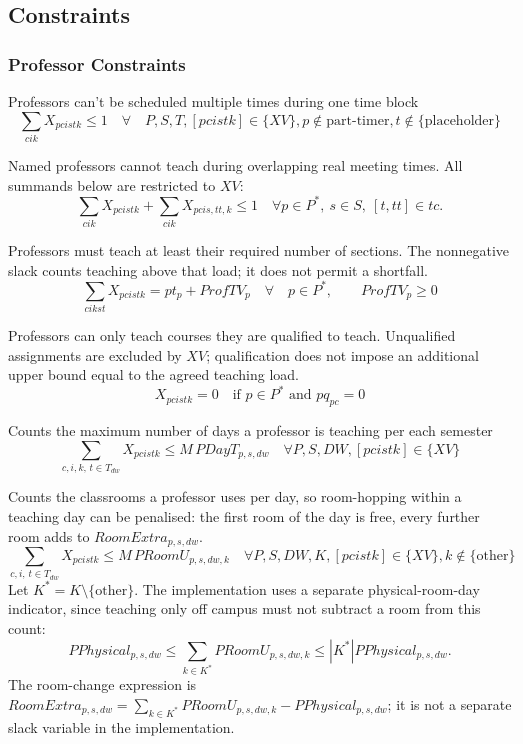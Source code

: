 \documentclass[11pt, oneside]{article}   	%
\begin{document}
\subsection{Constraints}


\subsubsection{Professor Constraints}
Professors can't be scheduled multiple times during one time block
\begin{equation}
	\sum_{cik} X_{pcistk} \le 1 \quad \forall \quad P, S,T, 
	[pcistk] \in \{ XV \}, p \not \in {\text{part-timer}},  t \not \in \{\text{placeholder} \}
\end{equation}

Named professors cannot teach during overlapping real meeting times. All
summands below are restricted to $XV$:
\begin{equation}
	\sum_{cik} X_{pcistk} + \sum_{cik} X_{pcis,tt,k} \le 1
	\quad \forall p\in P^*,\ s\in S,\ [t,tt]\in tc.
\end{equation}

Professors must teach at least their required number of sections. The
nonnegative slack counts teaching above that load; it does not permit a shortfall.
\begin{equation}
	\sum_{cikst} X_{pcistk} = pt_{p} + ProfTV_{p} \quad \forall \quad p\in P^{*},\qquad ProfTV_p\ge0
\end{equation}

Professors can only teach courses they are qualified to teach. Unqualified
assignments are excluded by $XV$; qualification does not impose an additional
upper bound equal to the agreed teaching load.
\begin{equation}
	X_{pcistk}=0 \quad \text{if }p\in P^{*}\text{ and }pq_{pc}=0
\end{equation}

Counts the maximum number of days a professor is teaching per each semester
\begin{equation}
	\sum_{c,i,k,\, t \in T_{dw}} X_{pcistk} \le M \, PDayT_{p,s,dw} \quad \forall P, S, DW, [pcistk] \in \{ XV \}
\end{equation}

Counts the classrooms a professor uses per day, so room-hopping within a
teaching day can be penalised: the first room of the day is free, every
further room adds to $RoomExtra_{p,s,dw}$.
\begin{equation}
	\sum_{c,i,\, t \in T_{dw}} X_{pcistk} \le M \, PRoomU_{p,s,dw,k} 
	\quad \forall P, S, DW, K, [pcistk] \in \{ XV \}, k \not \in \{ \text{other} \}
\end{equation}
Let $K^*=K\setminus\{\text{other}\}$. The implementation uses a separate
physical-room-day indicator, since teaching only off campus must not subtract
a room from this count:
\begin{equation}
	PPhysical_{p,s,dw}\le\sum_{k\in K^*}PRoomU_{p,s,dw,k}
	\le |K^*|PPhysical_{p,s,dw}.
\end{equation}
The room-change expression is
$RoomExtra_{p,s,dw}=\sum_{k\in K^*}PRoomU_{p,s,dw,k}-PPhysical_{p,s,dw}$;
it is not a separate slack variable in the implementation.
\end{document}
